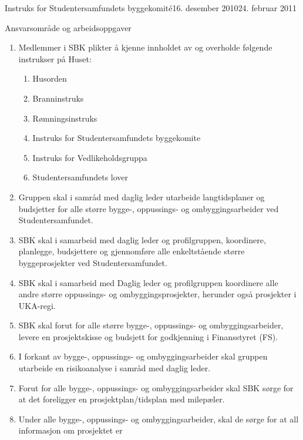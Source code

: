 \begin{instruks}{Instruks for Studentersamfundets byggekomité}{16. desember 2010}{24. februar 2011}
    \begin{instruksledd}{ Ansvarsområde og arbeidsoppgaver}
        \begin{enumerate}
            \item Medlemmer i SBK plikter å kjenne innholdet av og overholde følgende instrukser på
                Huset:
                \begin{enumerate}
                    \item Husorden
                    \item Branninstruks
                    \item Rømningsinstruks
                    \item Instruks for Studentersamfundets byggekomite
                    \item Instruks for Vedlikeholdsgruppa
                    \item Studentersamfundets lover
                \end{enumerate}
            \item Gruppen skal i samråd med daglig leder utarbeide langtidsplaner og
                budsjetter for alle større bygge-,
                oppussings- og ombyggingsarbeider ved Studentersamfundet.
            \item SBK skal i samarbeid med daglig leder og profilgruppen, koordinere,
                planlegge, budsjettere og gjennomføre
                alle enkeltstående større byggeprosjekter ved Studentersamfundet.
            \item SBK skal i samarbeid med Daglig leder og profilgruppen koordinere alle
                andre større oppussings- og
                ombyggingsprosjekter, herunder også prosjekter i UKA-regi.
            \item SBK skal forut for alle større bygge-, oppussings- og
                ombyggingsarbeider, levere en prosjektskisse og
                budsjett for godkjenning i Finansstyret (FS).
            \item I forkant av bygge-, oppussings- og ombyggingsarbeider skal gruppen
                utarbeide en risikoanalyse i samråd
                med daglig leder.
            \item  Forut for alle bygge-, oppussings- og ombyggingsarbeider skal SBK sørge
                for at det foreligger en
                prosjektplan/tidsplan med milepæler.
            \item Under alle bygge-, oppussings- og ombyggingsarbeider, skal de sørge for
                at all informasjon om prosjektet er

\end{enumerate}
\end{instruksledd}
\end{instruks}
